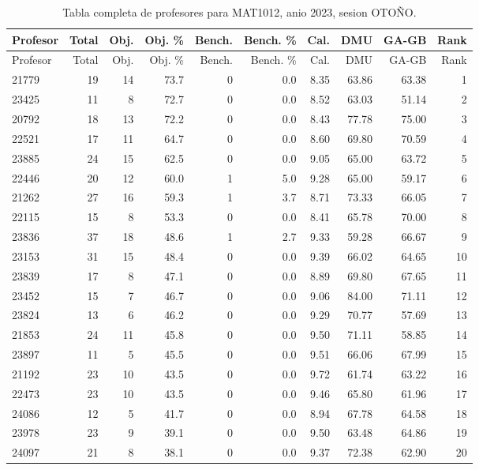 \begingroup
\scriptsize
\setlength{\tabcolsep}{3pt}
\begin{longtable}{lrrrrrrrrr}
\caption{Tabla completa de profesores para MAT1012, anio 2023, sesion OTOÑO.}\label{tab:prof-period-mat1012-2023-oto-o-especializado}\\
\toprule
Profesor & Total & Obj. & Obj. \% & Bench. & Bench. \% & Cal. & DMU & GA-GB & Rank \\
\midrule
\endfirsthead
\toprule
Profesor & Total & Obj. & Obj. \% & Bench. & Bench. \% & Cal. & DMU & GA-GB & Rank \\
\midrule
\endhead
21779 & 19 & 14 & 73.7 & 0 & 0.0 & 8.35 & 63.86 & 63.38 & 1 \\
23425 & 11 & 8 & 72.7 & 0 & 0.0 & 8.52 & 63.03 & 51.14 & 2 \\
20792 & 18 & 13 & 72.2 & 0 & 0.0 & 8.43 & 77.78 & 75.00 & 3 \\
22521 & 17 & 11 & 64.7 & 0 & 0.0 & 8.60 & 69.80 & 70.59 & 4 \\
23885 & 24 & 15 & 62.5 & 0 & 0.0 & 9.05 & 65.00 & 63.72 & 5 \\
22446 & 20 & 12 & 60.0 & 1 & 5.0 & 9.28 & 65.00 & 59.17 & 6 \\
21262 & 27 & 16 & 59.3 & 1 & 3.7 & 8.71 & 73.33 & 66.05 & 7 \\
22115 & 15 & 8 & 53.3 & 0 & 0.0 & 8.41 & 65.78 & 70.00 & 8 \\
23836 & 37 & 18 & 48.6 & 1 & 2.7 & 9.33 & 59.28 & 66.67 & 9 \\
23153 & 31 & 15 & 48.4 & 0 & 0.0 & 9.39 & 66.02 & 64.65 & 10 \\
23839 & 17 & 8 & 47.1 & 0 & 0.0 & 8.89 & 69.80 & 67.65 & 11 \\
23452 & 15 & 7 & 46.7 & 0 & 0.0 & 9.06 & 84.00 & 71.11 & 12 \\
23824 & 13 & 6 & 46.2 & 0 & 0.0 & 9.29 & 70.77 & 57.69 & 13 \\
21853 & 24 & 11 & 45.8 & 0 & 0.0 & 9.50 & 71.11 & 58.85 & 14 \\
23897 & 11 & 5 & 45.5 & 0 & 0.0 & 9.51 & 66.06 & 67.99 & 15 \\
21192 & 23 & 10 & 43.5 & 0 & 0.0 & 9.72 & 61.74 & 63.22 & 16 \\
22473 & 23 & 10 & 43.5 & 0 & 0.0 & 9.46 & 65.80 & 61.96 & 17 \\
24086 & 12 & 5 & 41.7 & 0 & 0.0 & 8.94 & 67.78 & 64.58 & 18 \\
23978 & 23 & 9 & 39.1 & 0 & 0.0 & 9.50 & 63.48 & 64.86 & 19 \\
24097 & 21 & 8 & 38.1 & 0 & 0.0 & 9.37 & 72.38 & 62.90 & 20 \\

\end{longtable}

